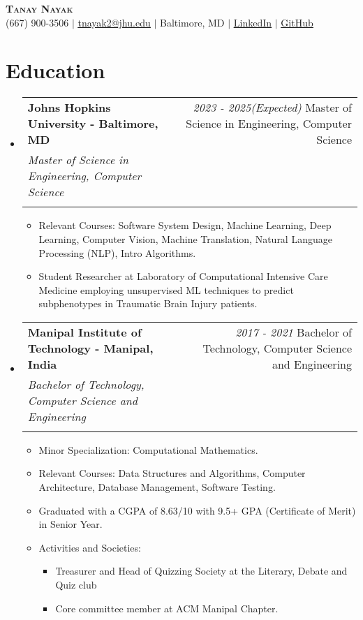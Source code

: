 \documentclass[letterpaper,10pt]{article} %
\makeatletter
\newcommand{\resumeItem}[1]{
  \item\small{
    {#1 \vspace{-1pt}}
  }
}
\newcommand{\resumeSubheading}[4]{
  \vspace{-2pt}\item
    \begin{tabular*}{0.97\textwidth}[t]{l@{\extracolsep{\fill}}r}
      \textbf{#1 - #2} & \textit{\small #4}
      \def\temp{#3}%
      \ifx\temp\empty %
      \else
        \\
        \textit{\small#3}\\
      \fi
    \end{tabular*}\vspace{-7pt}
}
\newcommand{\resumeSubHeadingListStart}{\begin{itemize}[leftmargin=0.15in, label={}]}
\newcommand{\resumeSubHeadingListEnd}{\end{itemize}}
\newcommand{\resumeItemListStart}{\begin{itemize}}
\newcommand{\resumeItemListEnd}{\end{itemize}\vspace{-5pt}}
\makeatother
\begin{document}
\begin{center}
    \textbf{\Huge \scshape Tanay Nayak} \\ \vspace{1pt}
    \small (667) 900-3506 $|$ \href{mailto:tnayak2@jhu.edu}{\underline{tnayak2@jhu.edu}} $|$ 
    Baltimore, MD $|$
    \href{https://www.linkedin.com/in/tanay-nayak/}{\underline{LinkedIn}} $|$
    \href{https://github.com/tanaynayak}{\underline{GitHub}}
\end{center}

\section{Education}
  \resumeSubHeadingListStart
    \resumeSubheading
      {Johns Hopkins University}{Baltimore, MD}
      {Master of Science in Engineering, Computer Science}{2023 - 2025(Expected)}
    \begin{itemize}
        \resumeItem{Relevant Courses: Software System Design, Machine Learning, Deep Learning, Computer Vision, Machine Translation, Natural Language Processing (NLP), Intro Algorithms.}
        \item Student Researcher at Laboratory of Computational Intensive Care Medicine employing unsupervised ML techniques to predict subphenotypes in Traumatic Brain Injury patients.
    \end{itemize}
    
    \resumeSubheading
      {Manipal Institute of Technology}{Manipal, India}
      {Bachelor of Technology, Computer Science and Engineering}{2017 - 2021}
    \resumeItemListStart
        \resumeItem{Minor Specialization: Computational Mathematics.}
        \resumeItem{ Relevant Courses: Data Structures and Algorithms, Computer Architecture, Database Management, Software Testing.}
        \resumeItem{ Graduated with a CGPA of 8.63/10 with 9.5+ GPA (Certificate of Merit) in Senior Year.}
        \resumeItem{ Activities and Societies:}
        \begin{itemize}[label=\textopenbullet]
            \item {\small Treasurer and Head of Quizzing Society at the Literary, Debate and Quiz club}
            \item {\small Core committee member at ACM Manipal Chapter.}
        \end{itemize}
    \resumeItemListEnd
  \resumeSubHeadingListEnd
\end{document}

